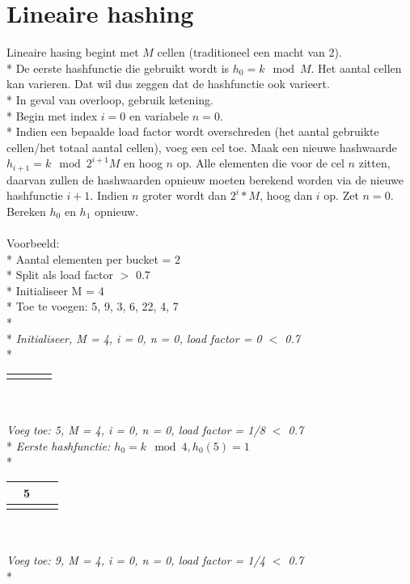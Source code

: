 \documentclass[10pt]{article}
\begin{document}
\section{Lineaire hashing}
Lineaire hasing begint met $M$ cellen (traditioneel een macht van 2).\\*
De eerste hashfunctie die gebruikt wordt is $h_0 = k\mod{M}$. Het aantal cellen kan varieren. Dat wil dus zeggen dat de hashfunctie ook varieert.\\*
In geval van overloop, gebruik ketening.\\*
Begin met index $i = 0$ en variabele $n = 0$.\\*
Indien een bepaalde load factor wordt overschreden (het aantal gebruikte cellen/het totaal aantal cellen), voeg een cel toe. Maak een nieuwe hashwaarde $h_{i+1} = k\mod{2^{i+1}M}$ en hoog $n$ op. Alle elementen die voor de cel $n$ zitten, daarvan zullen de hashwaarden opnieuw moeten berekend worden via de nieuwe hashfunctie $i+1$. Indien $n$ groter wordt dan $2^i*M$, hoog dan $i$ op. Zet $n = 0$. Bereken $h_0$ en $h_1$ opnieuw.\\\\
Voorbeeld:\\*
Aantal elementen per bucket = 2\\*
Split als load factor $>$ 0.7\\*
Initialiseer M = 4\\*
Toe te voegen: 5, 9, 3, 6, 22, 4, 7\\*\\*
\textit{Initialiseer, M = 4, i = 0, n = 0, load factor = 0 $<$ 0.7}\\*
\begin{tabular}{| c | c | c | c |} \hline
   &  &  &\\ \hline
   &  &  &\\ \hline
\end{tabular}\\\\
\textit{Voeg toe: 5, M = 4, i = 0, n = 0, load factor = 1/8 $<$ 0.7}\\*
\textit{Eerste hashfunctie: $h_0 = k\mod{4}, h_0(5) = 1$}\\*
\begin{tabular}{| c | c | c | c |} \hline
   & 5 &  &\\ \hline
   &  &  &\\ \hline
\end{tabular}\\\\
\textit{Voeg toe: 9, M = 4, i = 0, n = 0, load factor = 1/4 $<$ 0.7}\\*
\end{document}
